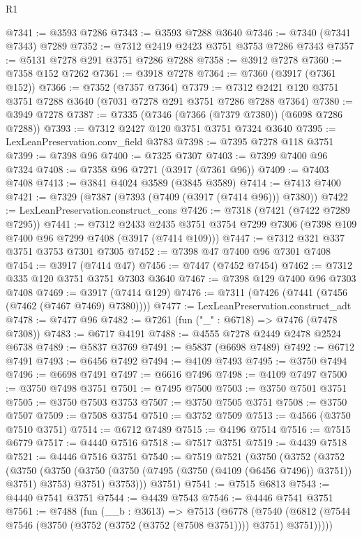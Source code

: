 \begin{lexlean}{R1}
\begin{coremodule}
@7341 := @3593 @7286
@7343 := @3593 @7288 @3640
@7346 := @7340 (@7341 @7343) @7289
@7352 := @7312 @2419 @2423 @3751 @3753 @7286 @7343
@7357 := @5131 @7278 @291 @3751 @7286 @7288
@7358 := @3912 @7278
@7360 := @7358 @152 @7262
@7361 := @3918 @7278
@7364 := @7360 (@3917 (@7361 @152))
@7366 := @7352 (@7357 @7364)
@7379 := @7312 @2421 @120 @3751 @3751 @7288 @3640 (@7031 @7278 @291 @3751 @7286 @7288 @7364)
@7380 := @3949 @7278
@7387 := @7335 (@7346 (@7366 (@7379 @7380)) (@6098 @7286 @7288))
@7393 := @7312 @2427 @120 @3751 @3751 @7324 @3640
@7395 := LexLeanPreservation.conv_field @3783
@7398 := @7395 @7278 @118 @3751
@7399 := @7398 @96
@7400 := @7325 @7307
@7403 := @7399 @7400 @96 @7324
@7408 := @7358 @96 @7271 (@3917 (@7361 @96))
@7409 := @7403 @7408
@7413 := @3841 @4024 @3589 (@3845 @3589)
@7414 := @7413 @7400
@7421 := @7329 (@7387 (@7393 (@7409 (@3917 (@7414 @96))) @7380))
@7422 := LexLeanPreservation.construct_cons
@7426 := @7318 (@7421 (@7422 @7289 @7295))
@7441 := @7312
    @2433
    @2435
    @3751
    @3754
    @7299
    @7306
    (@7398 @109 @7400 @96 @7299 @7408 (@3917 (@7414 @109)))
@7447 := @7312 @321 @337 @3751 @3753 @7301 @7305
@7452 := @7398 @47 @7400 @96 @7301 @7408
@7454 := @3917 (@7414 @47)
@7456 := @7447 (@7452 @7454)
@7462 := @7312 @335 @120 @3751 @3751 @7303 @3640
@7467 := @7398 @129 @7400 @96 @7303 @7408
@7469 := @3917 (@7414 @129)
@7476 := @7311 (@7426 (@7441 (@7456 (@7462 (@7467 @7469) @7380))))
@7477 := LexLeanPreservation.construct_adt
@7478 := @7477 @96
@7482 := @7261 (fun ("_" : @6718) => @7476 (@7478 @7308))
@7483 := @6717 @4191
@7488 := @4555 @7278 @2449 @2478 @2524 @6738
@7489 := @5837 @3769
@7491 := @5837 (@6698 @7489)
@7492 := @6712 @7491
@7493 := @6456 @7492
@7494 := @4109 @7493
@7495 := @3750 @7494
@7496 := @6698 @7491
@7497 := @6616 @7496
@7498 := @4109 @7497
@7500 := @3750 @7498 @3751
@7501 := @7495 @7500
@7503 := @3750 @7501 @3751
@7505 := @3750 @7503 @3753
@7507 := @3750 @7505 @3751
@7508 := @3750 @7507
@7509 := @7508 @3754
@7510 := @3752 @7509
@7513 := @4566 (@3750 @7510 @3751)
@7514 := @6712 @7489
@7515 := @4196 @7514
@7516 := @7515 @6779
@7517 := @4440 @7516
@7518 := @7517 @3751
@7519 := @4439 @7518
@7521 := @4446 @7516 @3751
@7540 := @7519
    @7521
    (@3750
      (@3752
        (@3752
          (@3750
            (@3750 (@3750 (@3750 (@7495 (@3750 (@4109 (@6456 @7496)) @3751)) @3751) @3753) @3751)
            @3753)))
      @3751)
@7541 := @7515 @6813
@7543 := @4440 @7541 @3751
@7544 := @4439 @7543
@7546 := @4446 @7541 @3751
@7561 := @7488
    (fun (__b : @3613) =>
    @7513
      (@6778
        (@7540 (@6812 (@7544 @7546 (@3750 (@3752 (@3752 (@3752 (@7508 @3751)))) @3751) @3751)))))

\end{coremodule}
\end{lexlean}
